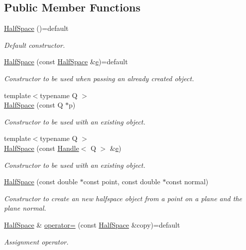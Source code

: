 \subsection*{Public Member Functions}
\begin{DoxyCompactItemize}
\item 
\hyperlink{class_d_d4hep_1_1_geometry_1_1_half_space_a329fa25e106b768a45aa7a63a7048727}{Half\+Space} ()=default
\begin{DoxyCompactList}\small\item\em Default constructor. \end{DoxyCompactList}\item 
\hyperlink{class_d_d4hep_1_1_geometry_1_1_half_space_a3fa7d338615d6423b90524d09ef01bf8}{Half\+Space} (const \hyperlink{class_d_d4hep_1_1_geometry_1_1_half_space}{Half\+Space} \&\hyperlink{_volumes_8cpp_a8a9a1f93e9b09afccaec215310e64142}{e})=default
\begin{DoxyCompactList}\small\item\em Constructor to be used when passing an already created object. \end{DoxyCompactList}\item 
{\footnotesize template$<$typename Q $>$ }\\\hyperlink{class_d_d4hep_1_1_geometry_1_1_half_space_a0bab4f1eb9c3c22c8e69736a7f68c6b7}{Half\+Space} (const Q $\ast$p)
\begin{DoxyCompactList}\small\item\em Constructor to be used with an existing object. \end{DoxyCompactList}\item 
{\footnotesize template$<$typename Q $>$ }\\\hyperlink{class_d_d4hep_1_1_geometry_1_1_half_space_ad2e06a41bd3b59b4e8b8336e48d2c8df}{Half\+Space} (const \hyperlink{class_d_d4hep_1_1_handle}{Handle}$<$ Q $>$ \&\hyperlink{_volumes_8cpp_a8a9a1f93e9b09afccaec215310e64142}{e})
\begin{DoxyCompactList}\small\item\em Constructor to be used with an existing object. \end{DoxyCompactList}\item 
\hyperlink{class_d_d4hep_1_1_geometry_1_1_half_space_adf737484b3071ad3fe7a41f24af83d4b}{Half\+Space} (const double $\ast$const point, const double $\ast$const normal)
\begin{DoxyCompactList}\small\item\em Constructor to create an new halfspace object from a point on a plane and the plane normal. \end{DoxyCompactList}\item 
\hyperlink{class_d_d4hep_1_1_geometry_1_1_half_space}{Half\+Space} \& \hyperlink{class_d_d4hep_1_1_geometry_1_1_half_space_abe9415e34df5e9f75975dd51463d8a92}{operator=} (const \hyperlink{class_d_d4hep_1_1_geometry_1_1_half_space}{Half\+Space} \&copy)=default
\begin{DoxyCompactList}\small\item\em Assignment operator. \end{DoxyCompactList}\end{DoxyCompactItemize}
